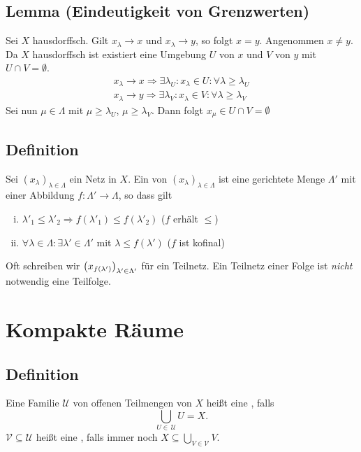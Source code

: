 \subsection{Lemma (Eindeutigkeit von Grenzwerten)} %
\label{sub:35}
Sei $X$ hausdorffsch. Gilt $x_\lambda  \to x$ und $x_\lambda \to y$, so folgt $x=y$.
Angenommen $x \not= y$. Da $X$ hausdorffsch ist existiert eine Umgebung $U$ von $x$ und $V$ von $y$ mit $U \cap V = \emptyset$. 
\begin{gather}
	x_\lambda \to x \Rightarrow \exists \lambda_U : x_\lambda  \in U : \forall \lambda \ge \lambda_U \\
	x_\lambda \to y \Rightarrow \exists \lambda_V : x_\lambda  \in V : \forall \lambda \ge \lambda_V 
\end{gather}
Sei nun $\mu \in \Lambda$ mit $\mu \ge \lambda_U$, $\mu \ge \lambda_V$. Dann folgt $x_\mu \in U\cap V = \emptyset$ \light \bewende

\subsection[Definition: Teilnetz]{Definition} %
\label{sub:36}
Sei $(x_\lambda)_{\lambda  \in \Lambda}$ ein Netz in $X$. Ein  von $(x_\lambda )_{\lambda  \in \Lambda}$ ist eine gerichtete Menge $\Lambda'$ mit einer
Abbildung $f : \Lambda' \to \Lambda$, so dass gilt
\begin{enumerate}[i)]
	\item $\lambda'_1 \le \lambda'_2 \Rightarrow f(\lambda'_1) \le f(\lambda'_2)$ \hfill ($f$ erhält $\le$)
	\item $\forall \lambda \in \Lambda : \exists \lambda' \in \Lambda'$ mit $\lambda  \le f(\lambda' )$ \hfill ($f$ ist kofinal)
\end{enumerate}
Oft schreiben wir $\enbrace*{x_{f(\lambda')}}_{\lambda' \in \Lambda'}$ für ein Teilnetz.
Ein Teilnetz einer Folge ist \emph{nicht} notwendig eine Teilfolge.
\newpage

\section{Kompakte Räume} %
\label{sec:4}

\subsection[Definition: Offene Überdeckung und Teilüberdeckung]{Definition} %
\label{sub:41}
Eine Familie $\mathcal{U}$ von offenen Teilmengen von $X$ heißt eine , falls 
\[
	\bigcup_{U \in \,\mathcal{U}} U = X.
\] 
$\mathcal{V} \subseteq \mathcal{U} $ heißt eine , falls immer noch $X \subseteq \bigcup_{V \in \mathcal{V} } V$.

